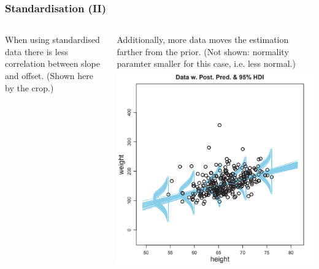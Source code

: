 \documentclass[usenames,dvipsnames,table]{beamer}
\begin{document}
\begin{frame}
\frametitle{Standardisation (II)}
\begin{columns}
When using standardised data there is less correlation between slope and offset. (Shown here by the crop.)

\vspace{1em} Additionally, more data moves the estimation farther from the prior. (Not shown: normality paramter smaller for this case, i.e. less normal.)
\includegraphics[width=\textwidth]{img/fig17_4_1}
\end{columns}
\end{frame}
\end{document}
